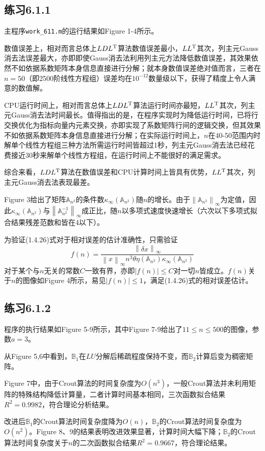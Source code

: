\documentclass[UTF8,a4paper,10pt]{ctexart}
\begin{document}
    \subsection{练习6.1.1}
        \par
        主程序\texttt{work\_611.m}的运行结果如Figure 1-4所示。
        \par
        数值误差上，相对而言总体上$LDL^{\rm T}$算法数值误差最小，$LL^{\rm T}$其次，列主元Gauss消去法误差最大，亦即即使Gauss消去法利用列主元方法降低数值误差，其效果依然不如依据系数矩阵本身信息直接进行分解；就本身数值误差绝对值而言，三者在$n=50$（即2500阶线性方程组）误差均在$10^{-12}$数量级以下，获得了精度上令人满意的数值解。
        \par
        CPU运行时间上，相对而言总体上$LDL^{\rm T}$算法运行时间亦最短，$LL^{\rm T}$其次，列主元Gauss消去法时间最长。值得指出的是，在程序实现时为降低运行时间，已将行交换优化为指标向量内元素交换，亦即实现了系数矩阵行间的逻辑交换，但其效果不如依据系数矩阵本身信息直接进行分解；在实际运行时间上，$n$在40-50范围内时解单个线性方程组三种方法所需运行时间皆超过1秒，列主元Gauss消去法已经花费接近30秒来解单个线性方程组，在运行时间上不能很好的满足需求。
        \par
        综合来看，$LDL^{\rm T}$算法在数值误差和CPU计算时间上皆具有优势，$LL^{\rm T}$其次，列主元Gauss消去法表现最差。
        \par
        Figure 3给出了矩阵$\mathbb{A}_{n^2}$的条件数$\kappa_\infty(\mathbb{A}_{n^2})$随$n$的增长。由于$\left\| \mathbb{A}_{n^2} \right\|_\infty$为定值，因此$\kappa_\infty(\mathbb{A}_{n^2})$与$\left\| \mathbb{A}_{n^2}^{-1} \right\|_\infty$成正比，随$n$以多项式速度快速增长（六次以下多项式拟合结果残差范数和皆在4以下）。
        \par
        为验证(1.4.26)式对于相对误差的估计准确性，只需验证
        $$
        f(n)=\dfrac{\left\| \delta x \right\|_\infty}{\left\| x \right\|_\infty n^3 \theta \eta(\mathbb{A}_{n^2})\kappa_\infty(\mathbb{A}_{n^2})}
        $$
        对于某个与$n$无关的常数$C$一致有界，亦即$\left|f(n)\right|\le C$对一切$n$皆成立。$f(n)$关于$n$的图像如Figure 4所示，易见$\left|f(n)\right|\le 1$，满足(1.4.26)式的相对误差估计。
    \subsection{练习6.1.2}
        \par
        程序的执行结果如Figure 5-9所示，其中Figure 7-9给出了$11\le n\le 500$的图像，参数$a=3$。
        \par
        从Figure 5,6中看到，$\mathbb{B}_1$在$LU$分解后稀疏程度保持不变，而$\mathbb{B}_2$计算后变为稠密矩阵。
        \par
        Figure 7中，由于Crout算法的时间复杂度为$O(n^3)$，一般Crout算法并未利用矩阵的特殊结构降低计算量，二者计算时间基本相同，三次函数拟合结果$R^2=0.9982$，符合理论分析结果。
        \par
        改进后$\mathbb{B}_1$的Crout算法时间复杂度降为$O(n)$，$\mathbb{B}_2$的Crout算法时间复杂度为$O(n^2)$。Figure 8、9的结果表明改进效果显著，计算时间大幅下降；$\mathbb{B}_2$的Crout算法时间复杂度关于$n$的二次函数拟合结果$R^2=0.9667$，符合理论结果。
\end{document}
